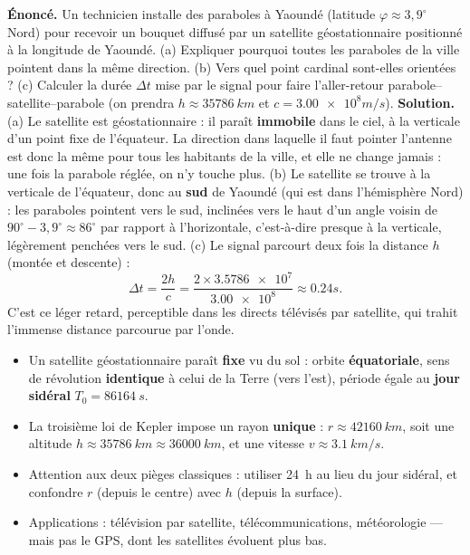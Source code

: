 \documentclass[11pt]{article}
\begin{document}
\begin{exoresolu}
\textbf{Énoncé.} Un technicien installe des paraboles à Yaoundé (latitude $\varphi \approx 3,9^{\circ}$ Nord) pour recevoir un bouquet diffusé par un satellite géostationnaire positionné à la longitude de Yaoundé. (a) Expliquer pourquoi toutes les paraboles de la ville pointent dans la même direction. (b) Vers quel point cardinal sont-elles orientées ? (c) Calculer la durée $\Delta t$ mise par le signal pour faire l'aller-retour parabole--satellite--parabole (on prendra $h \approx \SI{35786}{km}$ et $c = \num{3,00e8}{m/s}$).
\tcblower
\textbf{Solution.} (a) Le satellite est géostationnaire : il paraît \textbf{immobile} dans le ciel, à la verticale d'un point fixe de l'équateur. La direction dans laquelle il faut pointer l'antenne est donc la même pour tous les habitants de la ville, et elle ne change jamais : une fois la parabole réglée, on n'y touche plus.
(b) Le satellite se trouve à la verticale de l'équateur, donc au \textbf{sud} de Yaoundé (qui est dans l'hémisphère Nord) : les paraboles pointent vers le sud, inclinées vers le haut d'un angle voisin de $90^{\circ} - 3,9^{\circ} \approx 86^{\circ}$ par rapport à l'horizontale, c'est-à-dire presque à la verticale, légèrement penchées vers le sud.
(c) Le signal parcourt deux fois la distance $h$ (montée et descente) :
\[ \Delta t = \dfrac{2h}{c} = \dfrac{2\times\num{3,5786e7}}{\num{3,00e8}} \approx \boxed{\num{0,24}{s}}. \]
C'est ce léger retard, perceptible dans les directs télévisés par satellite, qui trahit l'immense distance parcourue par l'onde.
\end{exoresolu}

\begin{aretenir}
\begin{itemize}
\item Un satellite géostationnaire paraît \textbf{fixe} vu du sol : orbite \textbf{équatoriale}, sens de révolution \textbf{identique} à celui de la Terre (vers l'est), période égale au \textbf{jour sidéral} $T_0 = \SI{86164}{s}$.
\item La troisième loi de Kepler impose un rayon \textbf{unique} : $r \approx \SI{42160}{km}$, soit une altitude $h \approx \SI{35786}{km} \approx \SI{36000}{km}$, et une vitesse $v \approx \SI{3,1}{km/s}$.
\item Attention aux deux pièges classiques : utiliser \SI{24}{h} au lieu du jour sidéral, et confondre $r$ (depuis le centre) avec $h$ (depuis la surface).
\item Applications : télévision par satellite, télécommunications, météorologie — mais pas le GPS, dont les satellites évoluent plus bas.
\end{itemize}
\end{aretenir}
\end{document}
